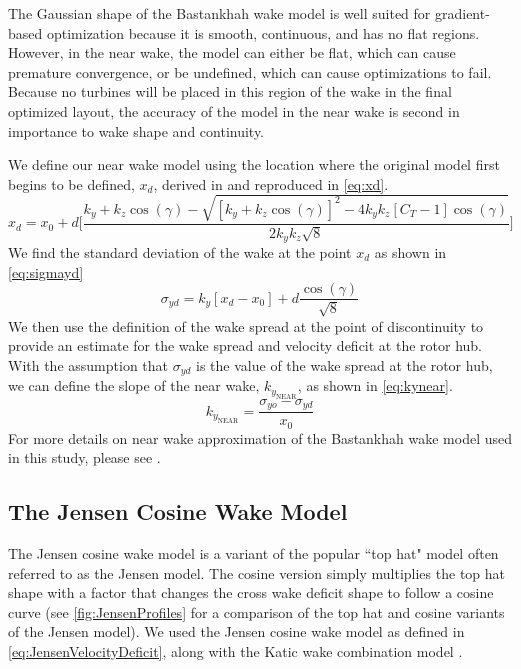 \documentclass{jpconf}
\begin{document}
The Gaussian shape of the Bastankhah wake model is well suited for gradient-based optimization because it is smooth, continuous, and has no flat regions. However, in the near wake, the model can either be flat, which can cause premature convergence, or be undefined, which can cause optimizations to fail. Because no turbines will be placed in this region of the wake in the final optimized layout, the accuracy of the model in the near wake is second in importance to wake shape and continuity. 

We define our near wake model using the location where the original model first begins to be defined, $x_d$, derived in \cite{thomas2019-les-validation} and reproduced in \cref{eq:xd}.
%
\begin{equation}\label{eq:xd}
x_d = x_0 +d \Bigg[ \frac{k_y+k_z\cos{(\gamma)} - \sqrt{[k_y+k_z\cos{(\gamma)}]^2-4k_y k_z[C_T-1]\cos{(\gamma)}}}{2k_y k_z\sqrt{8}}\Bigg]
\end{equation}
%
We find the standard deviation of the wake at the point $x_d$ as shown in \cref{eq:sigmayd}
%
\begin{equation}\label{eq:sigmayd}
\sigma_{yd} = k_y [x_d - x_0] + d\frac{\cos{(\gamma)}}{\sqrt{8}}
\end{equation}
%
We then use the definition of the wake spread at the point of discontinuity to provide an estimate for the wake spread and velocity deficit at the rotor hub. With the assumption that $\sigma_{yd}$ is the value of the wake spread at the rotor hub, we can define the slope of the near wake, $k_{y_{\text{NEAR}}}$, as shown in \cref{eq:kynear}.
%
\begin{equation}\label{eq:kynear}
k_{y_{\text{NEAR}}} = \frac{\sigma_{yo}-\sigma_{yd}}{x_0}
\end{equation}
For more details on near wake approximation of the Bastankhah wake model used in this study, please see \cite{thomas2019-les-validation}.

\subsection{The Jensen Cosine Wake Model}
The Jensen cosine wake model is a variant of the popular ``top hat" model often referred to as the Jensen model. The cosine version simply multiplies the top hat shape with a factor that changes the cross wake deficit shape to follow a cosine curve (see \cref{fig:JensenProfiles} for a comparison of the top hat and cosine variants of the Jensen model). We used the Jensen cosine wake model as defined in \cref{eq:JensenVelocityDeficit}, along with the Katic wake combination model \cite{katic1986}.
\end{document}
